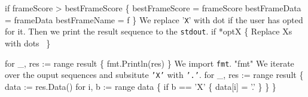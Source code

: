 if frameScore > bestFrameScore \{
          bestFrameScore = frameScore
          bestFrameData = frameData
          bestFrameName = f
\}
\nwendcode{}\nwdocspar
We replace '\texttt{X}' with dot if the user has opted for it. Then we
print the result sequence to the \texttt{stdout}.
\nwenddocs{}\endmoddef\nwstartdeflinemarkup{}\nwenddeflinemarkup
if *optX \{
            \LA{}Replace Xs with dots~{\nwtagstyle{}}\RA{}
\}

for _, res := range result \{
          fmt.Println(res)
\}
\nwendcode{}\nwdocspar
We import \texttt{fmt}.
\nwenddocs{}\plusendmoddef\nwstartdeflinemarkup{}\nwenddeflinemarkup
"fmt"
\nwendcode{}\nwdocspar
We iterate over the ouput sequences and subsitute \texttt{'X'} with
\texttt{'.'}.
\nwenddocs{}\endmoddef\nwstartdeflinemarkup{}\nwenddeflinemarkup
for _, res := range result \{
          data := res.Data()
          for i, b := range data \{
                  if b == 'X' \{
                          data[i] = '.'
                  \}
          \}
\}
\nwendcode{}

